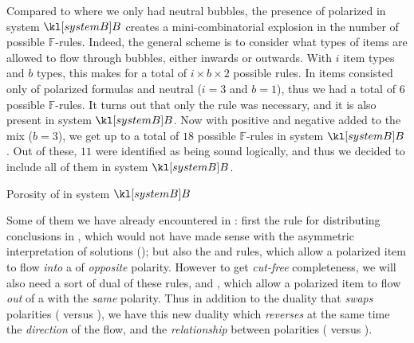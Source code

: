 \begin{description}
  Compared to  where we only had neutral bubbles, the presence of
  polarized  in system $\sysB$ creates a mini-combinatorial explosion in
  the number of possible $\mathbb{F}$-rules. Indeed, the general scheme is to
  consider what types of items are allowed to flow through bubbles, either
  inwards or outwards. With $i$ item types and $b$  types, this makes for
  a total of $i \times b \times 2$ possible rules. In  items consisted
  only of polarized formulas and neutral  ($i = 3$ and $b = 1$), thus we
  had a total of $6$ possible $\mathbb{F}$-rules. It turns out that only the
   rule was necessary, and it is also present in system
  $\sysB$. Now with positive and negative  added to the mix ($b = 3$), we
  get up to a total of $18$ possible $\mathbb{F}$-rules in system $\sysB$. Out
  of these, $11$ were identified as being sound logically, and thus we decided
  to include all of them in system $\sysB$.

  \begin{marginfigure}
    \caption{Porosity of  in system $\sysB$}
  \end{marginfigure}
  
  Some of them we have already encountered in : first the
   rule for distributing conclusions in , which
  would not have made sense with the asymmetric interpretation of solutions
  (); but also the  and
   rules, which allow a polarized item to flow
  \emph{into} a  of \emph{opposite} polarity. However to get
  \emph{cut-free} completeness, we will also need a sort of dual of these rules,
   and , which allow a polarized
  item to flow \emph{out} of a  with the \emph{same} polarity. Thus in
  addition to the duality that \emph{swaps} polarities
  ( versus ), we have this new
  duality which \emph{reverses} at the same time the \emph{direction} of the
  flow, and the \emph{relationship} between polarities
  ( versus ).


\end{description}

